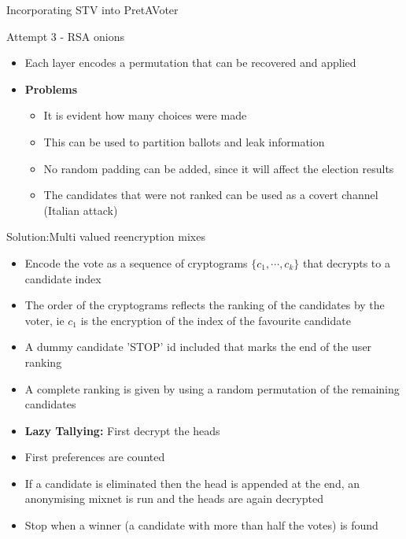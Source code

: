 \documentclass{beamer}
\begin{document}
\begin{frame}[allowframebreaks]{Incorporating STV into PretAVoter \cite{heather2007implementing}}
\begin{block}{Attempt 3 - RSA onions}
\begin{itemize}
\item Each layer encodes a permutation that can be recovered and applied
\item \textbf{Problems}
\begin{itemize}
\item It is evident how many choices were made
\item This can be used to partition ballots and leak information
\item No random padding can be added, since it will affect the election results
\item The candidates that were not ranked can be used as a covert channel (Italian attack)
\end{itemize}
\end{itemize}
\end{block}


\begin{block}{Solution:Multi valued reencryption mixes}
\begin{itemize}
\item Encode the vote as a sequence of cryptograms $\{ c_1, \cdots, c_k \} $ that decrypts to a candidate index
\item The order of the cryptograms reflects the ranking of the candidates by the voter, ie $c_1$ is the encryption of the index of the favourite candidate
\item A dummy candidate 'STOP' id included that marks the end of the user ranking
\item A complete ranking is given by using a random permutation of the remaining candidates
\item \textbf{Lazy Tallying:} First decrypt the heads
\item First preferences are counted
\item If a candidate is eliminated then the head is appended at the end, an anonymising mixnet is run and the heads are again decrypted
\item Stop when a winner (a candidate with more than half the votes) is found
\end{itemize}
\end{block}

\end{frame}
\end{document}
